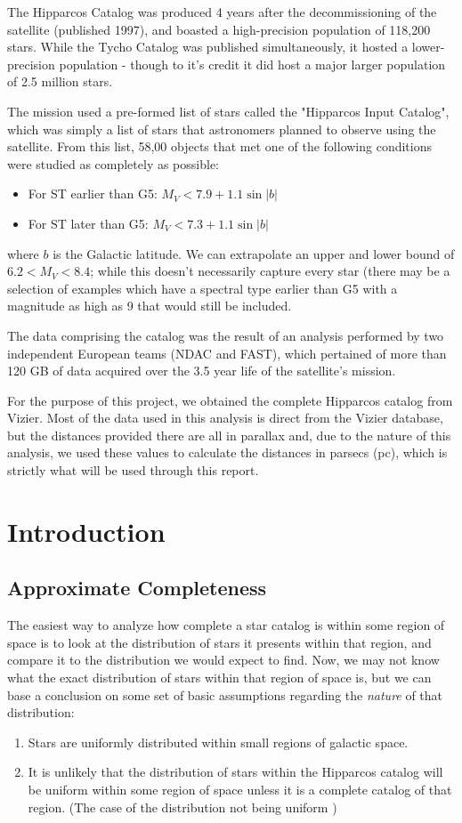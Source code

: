 \documentclass{business-covered} %
\begin{document}
			The Hipparcos Catalog was produced 4 years after the decommissioning of the satellite (published 1997), and boasted a high-precision population of 118,200 stars. While the Tycho Catalog was published simultaneously, it hosted a lower-precision population - though to it's credit it did host a major larger population of 2.5 million stars.
			
			The mission used a pre-formed list of stars called the "Hipparcos Input Catalog", which was simply a list of stars that astronomers planned to observe using the satellite. From this list, 58,00 objects that met one of the following conditions were studied as completely as possible:
				\begin{itemize}
					\item For ST earlier than G5: $M_V < 7.9 +1.1\sin|b|$
					\item For ST later than G5: $M_V < 7.3 +1.1\sin|b|$
				\end{itemize}
		where $b$ is the Galactic latitude. We can extrapolate an upper and lower bound of $6.2 < M_V < 8.4$; while this doesn't necessarily capture every star (there may be a selection of examples which have a spectral type earlier than G5 with a magnitude as high as 9 that would still be included.
		
		The data comprising the catalog was the result of an analysis performed by two independent European teams (NDAC and FAST), which pertained of more than 120 GB of data acquired over the 3.5 year life of the satellite's mission.
		
		For the purpose of this project, we obtained the complete Hipparcos catalog from Vizier. \cite{vizier} Most of the data used in this analysis is direct from the Vizier database, but the distances provided there are all in parallax and, due to the nature of this analysis, we used these values to calculate the distances in parsecs (pc), which is strictly what will be used through this report.		
		
\pagebreak
	\section{Introduction}
		\subsection{Approximate Completeness}
		The easiest way to analyze how complete a star catalog is within some region of space is to look at the distribution of stars it presents within that region, and compare it to the distribution we would expect to find. Now, we may not know what the exact distribution of stars within that region of space is, but we can base a conclusion on some set of basic assumptions regarding the \textit{nature} of that distribution:
			\begin{enumerate}
				\item Stars are uniformly distributed within small regions of galactic 							space.
				\item It is unlikely that the distribution of stars within the Hipparcos catalog will be uniform within some region of space unless it is a complete catalog of that region. (The case of the distribution not being uniform )
			\end{enumerate}
\end{document}
